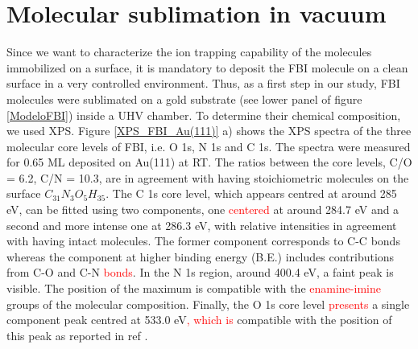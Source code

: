 \documentclass[aps,prl,reprint,longbibliography,superscriptaddress, english]{revtex4-1}
\begin{document}
\section{Molecular sublimation in vacuum}
Since we want to characterize the ion trapping capability of the molecules immobilized on a surface, it is mandatory to deposit the FBI molecule on a clean surface in a very controlled environment. Thus, as a first step in our study, FBI molecules were sublimated on a gold substrate (see lower panel of figure \ref{ModeloFBI}) inside a UHV chamber. To determine their chemical composition, we used XPS. Figure \ref{XPS_FBI_Au(111)} a) shows the XPS spectra of the three molecular core levels of FBI, i.e. O 1s, N 1s and C 1s. The spectra were measured for 0.65 ML deposited on Au(111) at RT. The ratios between the core levels, C/O = 6.2, C/N = 10.3, are in agreement with having stoichiometric molecules on the surface $ C_{31}N_{3}O_{5}H_{35}$. The C 1s core level, which appears centred at around 285 eV, can be fitted using two components, one \textcolor{red}{centered} at around 284.7 eV and a second and more intense one at 286.3 eV, with relative intensities in agreement with having intact molecules. The former component corresponds to C-C bonds whereas the component at higher binding energy (B.E.) includes contributions from C-O and C-N \textcolor{red}{bonds}. In the N 1s region, around 400.4 eV, a faint peak is visible. The position of the maximum is compatible with the \textcolor{red}{enamine-imine} groups of the molecular composition. Finally, the O 1s core level \textcolor{red}{presents} a single component peak centred at 533.0 eV\textcolor{red}{, which is} compatible with the position of this peak as reported in ref \cite{stredansky_-surface_2019}. 
\end{document}
